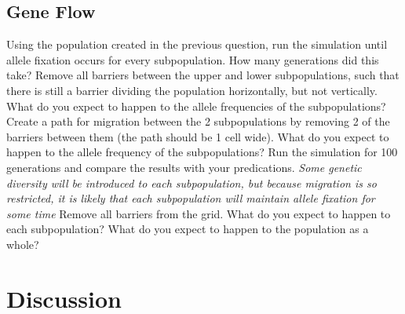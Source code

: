 \documentclass[12pt]{article}
\begin{document}
\begin{spacing}{1.5}
\subsection{Gene Flow}
Using the population created in the previous question, run the simulation until allele fixation occurs for every subpopulation. How many generations did this take?\newline
\newline
Remove all barriers between the upper and lower subpopulations, such that there is still a barrier dividing the population horizontally, but not vertically. What do you expect to happen to the allele frequencies of the subpopulations?\newline
\newline
Create a path for migration between the 2 subpopulations by removing 2 of the barriers between them (the path should be 1 cell wide). What do you expect to happen to the allele frequency of the subpopulations? Run the simulation for 100 generations and compare the results with your predications.\newline
\newline
\textit{Some genetic diversity will be introduced to each subpopulation, but because migration is so restricted, it is likely that each subpopulation will maintain allele fixation for some time}\newline
\newline
Remove all barriers from the grid. What do you expect to happen to each subpopulation? What do you expect to happen to the population as a whole?
\section{Discussion}

\end{spacing}
\end{document}
